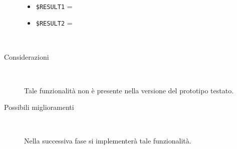 \documentclass[../../SperimentazioniPratiche.tex]{subfiles}
\begin{document}
\begin{tcolorbox}[fonttitle=\bfseries, 
								adjusted title={\Large Prova 3A.1}, 
								breakable, 
								sharp corners=south,
								colback=white, 
								colframe=white!60!black]
\begin{description}[leftmargin=0.7cm,labelwidth=!]
\begin{description}
        					\item[\dispositivoB] \ \par
        					\begin{itemize}
        						\item \verb|$RESULT1| = \ns
        						\item \verb|$RESULT2| = \ns
        					\end{itemize}
        					
        				\end{description}
        				
        			\tcbline
        			
        			\item[Analisi risultati] \ \par
        				\begin{description}
        					\item[Considerazioni] \ \par
        						Tale funzionalità non è presente nella versione del prototipo testato.
        					
        					\item[Possibili miglioramenti] \ \par 
        						Nella successiva fase si implementerà tale funzionalità.
        				\end{description}
        				
				\end{description}  
				
			\end{tcolorbox}



	
	\newpage	
\end{document}
